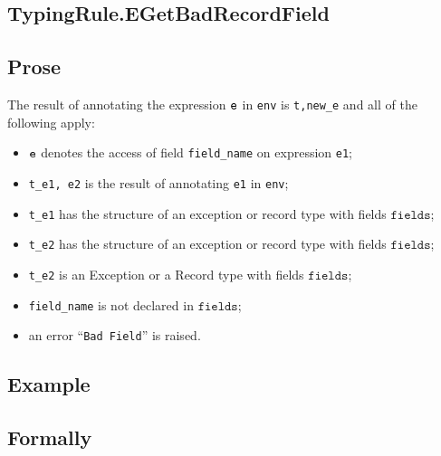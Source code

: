 \documentclass{book}
\newcommand\fields[0]{\texttt{fields}}
\begin{document}
\begin{itemize}

\section{TypingRule.EGetBadRecordField \label{sec:TypingRule.EGetBadRecordField}}

  \subsection{Prose}
  The result of annotating the expression $\texttt{e}$ in \texttt{env} is
\texttt{t,new\_e} and all of the following apply:
  \begin{itemize}
  \item $\texttt{e}$ denotes the access of field \texttt{field\_name} on expression \texttt{e1};
  \item \texttt{t\_e1, e2} is the result of annotating \texttt{e1} in \texttt{env};
  \item \texttt{t\_e1} has the structure of an exception or record type with fields $\fields$;
  \item \texttt{t\_e2} has the structure of an exception or record type with fields $\fields$;
  \item \texttt{t\_e2} is an Exception or a Record type with fields $\fields$;
  \item \texttt{field\_name} is not declared in $\fields$;
  \item an error ``\texttt{Bad Field}'' is raised.
  \end{itemize}

  \subsection{Example}



\begin{emptyformal}
    \subsection{Formally}

\end{emptyformal}



\end{itemize}
\end{document}
